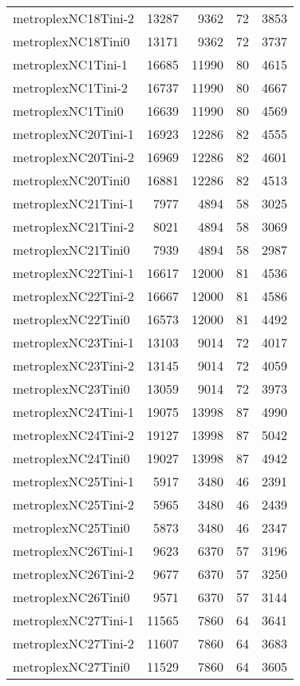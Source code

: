 \begin{tabular}{lrrrr}
metroplexNC18Tini-2 & 13287 & 9362 & 72 & 3853 \\
metroplexNC18Tini0 & 13171 & 9362 & 72 & 3737 \\
metroplexNC1Tini-1 & 16685 & 11990 & 80 & 4615 \\
metroplexNC1Tini-2 & 16737 & 11990 & 80 & 4667 \\
metroplexNC1Tini0 & 16639 & 11990 & 80 & 4569 \\
metroplexNC20Tini-1 & 16923 & 12286 & 82 & 4555 \\
metroplexNC20Tini-2 & 16969 & 12286 & 82 & 4601 \\
metroplexNC20Tini0 & 16881 & 12286 & 82 & 4513 \\
metroplexNC21Tini-1 & 7977 & 4894 & 58 & 3025 \\
metroplexNC21Tini-2 & 8021 & 4894 & 58 & 3069 \\
metroplexNC21Tini0 & 7939 & 4894 & 58 & 2987 \\
metroplexNC22Tini-1 & 16617 & 12000 & 81 & 4536 \\
metroplexNC22Tini-2 & 16667 & 12000 & 81 & 4586 \\
metroplexNC22Tini0 & 16573 & 12000 & 81 & 4492 \\
metroplexNC23Tini-1 & 13103 & 9014 & 72 & 4017 \\
metroplexNC23Tini-2 & 13145 & 9014 & 72 & 4059 \\
metroplexNC23Tini0 & 13059 & 9014 & 72 & 3973 \\
metroplexNC24Tini-1 & 19075 & 13998 & 87 & 4990 \\
metroplexNC24Tini-2 & 19127 & 13998 & 87 & 5042 \\
metroplexNC24Tini0 & 19027 & 13998 & 87 & 4942 \\
metroplexNC25Tini-1 & 5917 & 3480 & 46 & 2391 \\
metroplexNC25Tini-2 & 5965 & 3480 & 46 & 2439 \\
metroplexNC25Tini0 & 5873 & 3480 & 46 & 2347 \\
metroplexNC26Tini-1 & 9623 & 6370 & 57 & 3196 \\
metroplexNC26Tini-2 & 9677 & 6370 & 57 & 3250 \\
metroplexNC26Tini0 & 9571 & 6370 & 57 & 3144 \\
metroplexNC27Tini-1 & 11565 & 7860 & 64 & 3641 \\
metroplexNC27Tini-2 & 11607 & 7860 & 64 & 3683 \\
metroplexNC27Tini0 & 11529 & 7860 & 64 & 3605 \\

\end{tabular}

